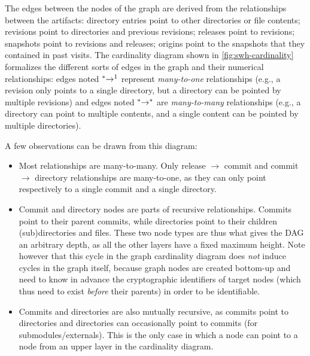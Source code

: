 The edges between the nodes of the graph are derived from the relationships
between the artifacts: directory entries point to other directories or file
contents; revisions point to directories and previous revisions; releases point
to revisions; snapshots point to revisions and releases; origins point to the
snapshots that they contained in past visits.
The cardinality diagram shown in \cref{fig:swh-cardinality} formalizes the
different sorts of edges in the graph and their numerical relationships: edges
noted $\prescript{\ast}{}\rightarrow^1$ represent \emph{many-to-one}
relationships (e.g., a revision only points to a single directory, but a
directory can be pointed by multiple revisions) and edges noted
$\prescript{\ast}{}\rightarrow^\ast$ are \emph{many-to-many} relationships
(e.g., a directory can point to multiple contents, and a single content can be
pointed by multiple directories).

A few observations can be drawn from this diagram:

\begin{itemize}
    \item Most relationships are many-to-many. Only release $\to$ commit
        and commit $\to$ directory relationships are many-to-one, as
        they can only point respectively to a single commit and a single
        directory.

    \item Commit and directory nodes are parts of recursive relationships.
        Commits point to their parent commits, while directories point to their
        children (sub)directories and files. These two node types are thus what
        gives the DAG an arbitrary depth, as all the other layers have a fixed
        maximum height. Note however that this cycle in the graph cardinality
        diagram does \emph{not} induce cycles in the graph itself, because
        graph nodes are created bottom-up and need to know in advance the
        cryptographic identifiers of target nodes (which thus need to
        exist \emph{before} their parents) in order to be identifiable.

    \item Commits and directories are also mutually recursive, as commits point
        to directories and directories can occasionally point to commits (for
        submodules/externals). This is the only case in which a node can point
        to a node from an upper layer in the cardinality diagram.
\end{itemize}

